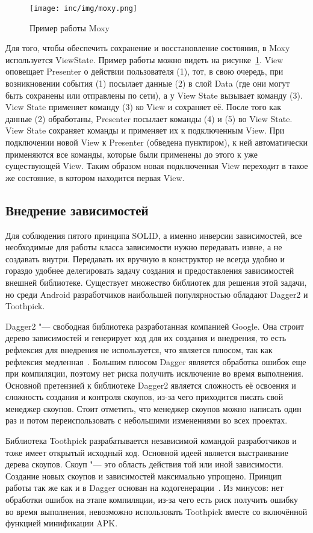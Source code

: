 \begin{figure}[ht]
  \texttt{[image: inc/img/moxy.png]}
  \caption{Пример работы Moxy}
  \label{fig:moxy}
\end{figure}

Для того, чтобы обеспечить сохранение и восстановление состояния, в Moxy используется ViewState.
Пример работы можно видеть на рисунке~\ref{fig:moxy}.
View оповещает Presenter о действии пользователя (1), тот, в свою очередь, при возникновении события (1) посылает данные (2) в слой Data (где они могут быть сохранены или отправлены по сети), а у View State вызывает команду (3).
View State применяет команду (3) ко View и сохраняет её.
После того как данные (2) обработаны, Presenter посылает команды (4) и (5) во View State.
View State сохраняет команды и применяет их к подключенным View.
При подключении новой View к Presenter (обведена пунктиром), к ней автоматически применяются все команды, которые были применены до этого к уже существующей View.
Таким образом новая подключенная View переходит в такое же состояние, в котором находится первая View.

\subsection{Внедрение зависимостей}
\label{subsec:di}
Для соблюдения пятого принципа SOLID, а именно инверсии зависимостей, все необходимые для работы класса зависимости нужно передавать извне, а не создавать внутри.
Передавать их вручную в конструктор не всегда удобно и гораздо удобнее делегировать задачу создания и предоставления зависимостей внешней библиотеке.
Существует множество библиотек для решения этой задачи, но среди Android разработчиков наибольшей популярностью обладают Dagger2 и Toothpick.

Dagger2 "--- свободная библиотека разработанная компанией Google.
Она строит дерево зависимостей и генерирует код для их создания и внедрения, то есть рефлексия для внедрения не используется, что является плюсом, так как рефлексия медленная~\cite{dagger}.
Большим плюсом Dagger является обработка ошибок еще при компиляции, поэтому нет риска получить исключение во время выполнения.
Основной претензией к библиотеке Dagger2 является сложность её освоения и сложность создания и контроля скоупов, из-за чего приходится писать свой менеджер скоупов.
Стоит отметить, что менеджер скоупов можно написать один раз и потом переиспользовать с небольшими изменениями во всех проектах.

Библиотека Toothpick разрабатывается независимой командой разработчиков и тоже имеет открытый исходный код.
Основной идеей является выстраивание дерева скоупов.
Скоуп "--- это область действия той или иной зависимости.
Создание новых скоупов и зависимостей максимально упрощено.
Принцип работы так же как и в Dagger основан на кодогенерации~\cite{github:tp}.
Из минусов: нет обработки ошибок на этапе компиляции, из-за чего есть риск получить ошибку во время выполнения, невозможно использовать Toothpick вместе со включённой функцией минификации APK\@.

